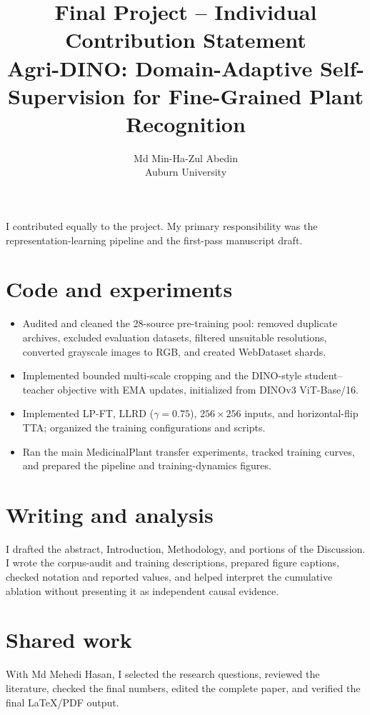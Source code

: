 \documentclass[11pt]{article}
\title{\textbf{Final Project -- Individual Contribution Statement}\\[0.4em]
       \large Agri-DINO: Domain-Adaptive Self-Supervision for Fine-Grained Plant Recognition}
\author{Md Min-Ha-Zul Abedin\\
Auburn University}
\date{}
\begin{document}
\maketitle

I contributed equally to the project. My primary responsibility was the
representation-learning pipeline and the first-pass manuscript draft.

\section*{Code and experiments}

\begin{itemize}
  \item Audited and cleaned the 28-source pre-training pool: removed duplicate
        archives, excluded evaluation datasets, filtered unsuitable resolutions,
        converted grayscale images to RGB, and created WebDataset shards.
  \item Implemented bounded multi-scale cropping and the DINO-style
        student--teacher objective with EMA updates, initialized from DINOv3
        ViT-Base/16.
  \item Implemented LP-FT, LLRD ($\gamma=0.75$), $256\times256$ inputs, and
        horizontal-flip TTA; organized the training configurations and scripts.
  \item Ran the main MedicinalPlant transfer experiments, tracked training
        curves, and prepared the pipeline and training-dynamics figures.
\end{itemize}

\section*{Writing and analysis}
I drafted the abstract, Introduction, Methodology, and portions of the
Discussion. I wrote the corpus-audit and training descriptions, prepared figure
captions, checked notation and reported values, and helped interpret the
cumulative ablation without presenting it as independent causal evidence.

\section*{Shared work}
With Md Mehedi Hasan, I selected the research questions, reviewed the
literature, checked the final numbers, edited the complete paper, and verified
the final LaTeX/PDF output.
\end{document}
